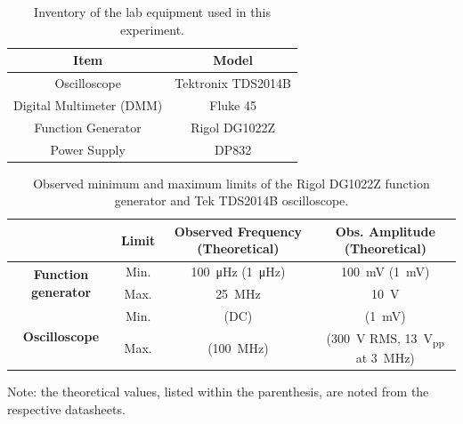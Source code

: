 \documentclass{report}
\newcommand{\pp}{_{pp}}
\newcommand{\Vpp}{\V\pp}
\begin{document}
\pagebreak
\hspace{0pt}
\vfill

\begin{table}[H]
	\centering
	\caption{Inventory of the lab equipment used in this experiment.}
	\begin{threeparttable}
		\label{table:exp0}
		\begin{tabular}{cc}
			\toprule
			Item & Model \\
			\midrule
			Oscilloscope & Tektronix TDS2014B \\
			Digital Multimeter (DMM) & Fluke 45 \\
			Function Generator & Rigol DG1022Z \\
			Power Supply & DP832 \\
			\bottomrule
		\end{tabular}
	\end{threeparttable}
\end{table}

\begin{table}[H]
	\centering
	\caption{Observed minimum and maximum limits of the Rigol DG1022Z function generator and Tek TDS2014B oscilloscope.}
	\begin{threeparttable}
		\label{table:exp1}
		\begin{tabular}{cccc}
			\toprule
			& Limit & Observed Frequency (Theoretical) & Obs. Amplitude (Theoretical) \\
			\midrule
			\multirow{2}{*}{\textbf{Function generator}} & Min. & \SI{100}{\micro\Hz} (\SI{1}{\micro\Hz}) & \SI{100}{\milli\V} (\SI{1}{\milli\volt}) \\
			& Max. & \SI{25}{\MHz} & \SI{10}{\V} \\
			\midrule
			\multirow{2}{*}{\textbf{Oscilloscope}} & Min. & (DC) & (\SI{1}{\mV}) \\
			& Max. & (\SI{100}{\MHz}) & (\SI{300}{\V} RMS, \SI{13}{\Vpp} at \SI{3}{\MHz}) \\
			\bottomrule
		\end{tabular}
		\begin{tablenotes}
			\item \footnotesize Note: the theoretical values, listed within the parenthesis, are noted from the respective datasheets.
		\end{tablenotes}
	\end{threeparttable}
\end{table}

\vfill
\hspace{0pt}
\pagebreak
\end{document}
